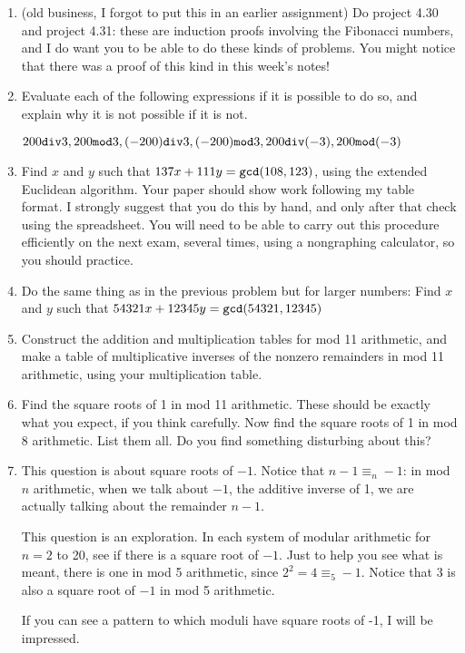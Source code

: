 \documentclass[12pt]{article}
\begin{document}
\begin{enumerate}

\item (old business, I forgot to put this in an earlier assignment)   Do project 4.30 and project 4.31:  these are induction proofs involving the Fibonacci numbers, and I do want you to be able to do these kinds of problems.  You might notice that there was a proof of this kind in this week's notes!

\item  Evaluate each of the following expressions if it is possible to do so, and explain why it is not possible if it is not.

$200{\tt div}3, 200 {\tt mod}3,  (-200){\tt div}3,  (-200) {\tt mod}3,  200{\tt div}(-3),  200 {\tt mod}(-3)$

\item  Find $x$ and $y$ such that $137x + 111y = {\tt gcd}(108,123)$, using the extended Euclidean algorithm.  Your paper should show work following my table format.  I strongly suggest that you do this by hand, and only after that check using the spreadsheet.  You will need to be able to carry out this procedure efficiently on the next exam, several times, using a nongraphing calculator, so you should practice.

\item Do the same thing as in the previous problem but for larger numbers:  Find $x$ and $y$ such that $54321x + 12345y = {\tt gcd}(54321,12345)$

\item  Construct the addition and multiplication tables for mod 11 arithmetic, and make a table of multiplicative inverses of the nonzero remainders in mod 11 arithmetic, using your multiplication table.

\item  Find the square roots of 1 in mod 11 arithmetic.  These should be exactly what you expect, if you think carefully.  Now find the square roots of 1 in mod 8 arithmetic.  List them all.  Do you find something disturbing about this?

\item  This question is about square roots of $-1$.  Notice that $n-1 \equiv_n -1$:  in mod $n$ arithmetic, when we talk about $-1$, the additive inverse of 1,  we are actually talking about the remainder $n-1$.

This question is an exploration.  In each system of modular arithmetic for $n=2$ to 20, see if there is a square root of $-1$.  Just to help you see what is meant, there is one in mod 5 arithmetic, since $2^2 = 4 \equiv_5 -1$.  Notice that 3 is also a square root of $-1$ in mod 5 arithmetic.

If you can see a pattern to which moduli have square roots of -1, I will be impressed.

\end{enumerate}
\end{document}
